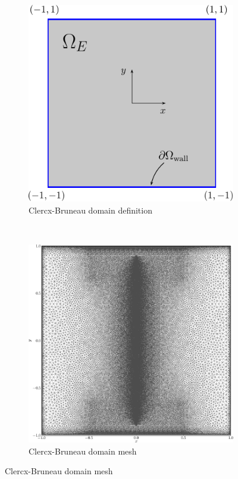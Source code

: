 	\begin{figure}[t]
     \centering
     \begin{subfigure}[t]{0.45\textwidth}
             \includegraphics[width=\textwidth]{figures/eulerian/clercxBruneauDomainDefinition-crop.pdf}
             \caption{Clercx-Bruneau domain definition}
             \label{fig:clercxBruneauDomainDefinition}
     \end{subfigure}%
     ~ %
     \begin{subfigure}[t]{0.45\textwidth}
             \includegraphics[width=\textwidth]{figures/eulerian/clercxBruneauDomainMesh-crop.pdf}
             \caption{Clercx-Bruneau domain mesh}
             \label{fig:clercxBruneauDomainMesh}
     \end{subfigure}


\end{figure}
